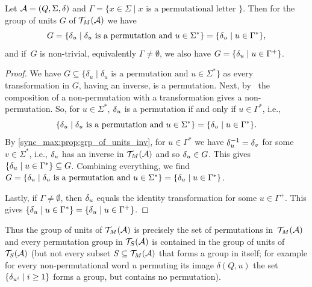 \begin{proposition}
	\label{sync_max:prop:grp_of_units_TA}	
	Let $\mathcal A = (Q, \Sigma, \delta)$ and 
	$\Gamma = \{ x \in \Sigma \mid x \text{ is a permutational letter } \}$.
	Then for the group of units $G$ of $\mathcal T_M(\mathcal A)$ we have
	\[
	G = \{ \delta_u \mid \text{$\delta_u$ is a permutation and $u \in \Sigma^*$} \}
	= \{ {\delta}_{u} \mid u \in \Gamma^* \},
	\]
	and if~$G$ is non-trivial, equivalently $\Gamma \ne \emptyset$,
	we also have $G =  \{ {\delta}_{u} \mid u \in \Gamma^+ \}$.
\end{proposition}
\begin{proof}
	We have	$G \subseteq \{ \delta_u \mid \text{$\delta_u$ is a permutation and $u \in \Sigma^*$} \}$ 
	as every transformation in $G$, having an inverse, is a permutation.
	Next, by~ 
	the composition of a non-permutation with a transformation
	gives a non-permutation.  So, for $u \in \Sigma^*$,
	${\delta}_{u}$ is a permutation if and only if $u \in \Gamma^*$, i.e.,
	\[ 
	\{ \delta_u \mid \text{$\delta_u$ is a permutation and $u \in \Sigma^*$} \}
	= \{ {\delta}_{u} \mid u \in \Gamma^* \}.
	\]	
	By \cref{sync_max:prop:grp_of_units_inv},
	for $u \in \Gamma^*$
	we have ${\delta}_{u}^{-1} = {\delta}_{v}$ for some $v \in \Sigma^*$, i.e.,
	${\delta}_{u}$ has an inverse in $\mathcal T_M(\mathcal A)$
	and so ${\delta}_{u} \in G$.
	This gives $\{ {\delta}_{u} \mid u \in \Gamma^* \} \subseteq G$.
	Combining everything,
	we find $G = \{ \delta_u \mid \text{$\delta_u$ is a permutation and $u \in \Sigma^*$} \}
	= \{ {\delta}_{u} \mid u \in \Gamma^* \}$.
	
	Lastly, if $\Gamma \ne \emptyset$,
	then ${\delta}_{u}$ equals the identity transformation
	for some $u \in \Gamma^+$.
	This gives $\{ {\delta}_{u} \mid u \in \Gamma^* \}
	= \{ {\delta}_{u} \mid u \in \Gamma^+ \}$.
\end{proof}

Thus the group of units of $\mathcal T_M(\mathcal A)$ is precisely the set of permutations in~$\mathcal T_M(\mathcal A)$
and every permutation group in $\mathcal T_S(\mathcal A)$ is contained in the group of units of $\mathcal T_S(\mathcal A)$ (but not every
subset $S \subseteq \mathcal T_M(\mathcal A)$ that forms a group in itself; for example
for every non-permutational word $u$ permuting its image $\delta(Q, u)$ 
the set $\{ {\delta}_{u^i} \mid i \ge 1 \}$
forms a group, but contains no permutation).